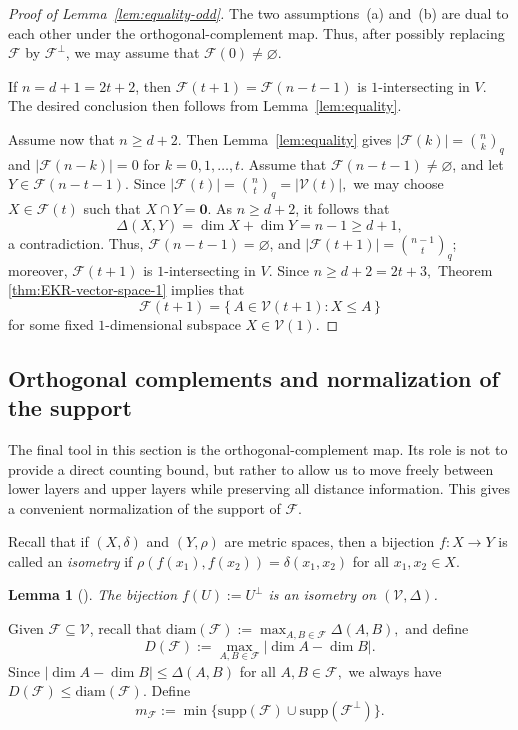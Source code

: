 \documentclass[11pt]{article}
\newtheorem{lemma}[theorem]{Lemma}
\theoremstyle{definition}
\newcommand{\qbinom}[2]{\genfrac{(}{)}{0pt}{}{#1}{#2}_q}
\newcommand{\diam}{\mathrm{diam}}
\newcommand{\supp}{\mathrm{supp}}
\begin{document}
\begin{proof}[Proof of Lemma~\ref{lem:equality-odd}]
The two assumptions~(a) and~(b) are dual to each other under the orthogonal-complement map. 
Thus, after possibly replacing $\mathcal{F}$ by $\mathcal{F}^\perp$, we may assume that $\mathcal{F}(0)\neq \varnothing$. 

If $n=d+1=2t+2$, then $\mathcal{F}(t+1)=\mathcal{F}(n-t-1)$ is $1$-intersecting in $V$. 
The desired conclusion then follows from Lemma~\ref{lem:equality}.

Assume now that $n\ge d+2$. Then Lemma~\ref{lem:equality} gives
\(
|\mathcal{F}(k)|=\qbinom{n}{k}\)
and
\(
|\mathcal{F}(n-k)|=0
\)
for \(k=0,1,\ldots,t.\)
Assume that $\mathcal{F}(n-t-1) \neq \varnothing$, and let $Y \in \mathcal{F}(n-t-1)$. Since
\(
|\mathcal{F}(t)| = \qbinom{n}{t} = |\mathcal V(t)|,
\)
we may choose $X \in \mathcal{F}(t)$ such that $X \cap Y = \boldsymbol{0}$. As $n \ge d+2$, it follows that
\[
\Delta(X,Y) = \dim X + \dim Y = n-1 \ge d+1,
\]
a contradiction. Thus, $\mathcal{F}(n-t-1) = \varnothing$, and $|\mathcal{F}(t+1)| = \qbinom{n-1}{t}$; moreover, $\mathcal{F}(t+1)$ is $1$-intersecting in $V$.
Since
\(
n\ge d+2=2t+3,
\) 
Theorem \ref{thm:EKR-vector-space-1} implies that
\[
\mathcal{F}(t+1)=\{\,A\in \mathcal{V}(t+1): X \le A\,\}
\]
for some fixed $1$-dimensional subspace $X \in \mathcal{V}(1)$.
\qedhere
\end{proof}

\subsection{Orthogonal complements and normalization of the support}

The final tool in this section is the orthogonal-complement map. 
Its role is not to provide a direct counting bound, but rather to allow us to move freely between lower layers and upper layers while preserving all distance information. 
This gives a convenient normalization of the support of $\mathcal{F}$.

Recall that if $(X,\delta)$ and $(Y,\rho)$ are metric spaces, then a bijection $f:X\to Y$ is called an \emph{isometry} if
\(
\rho(f(x_1),f(x_2))=\delta(x_1,x_2)\)
for all \(x_1,x_2\in X.\)


\begin{lemma}[\cite{LLY2026}]\label{lem:orthogonal}
The bijection $f(U):=U^\perp$ is an isometry on $(\mathcal{V},\Delta)$.
\end{lemma}

Given $\mathcal{F}\subseteq \mathcal{V}$, recall that
\(
\diam(\mathcal{F})
:=
\max_{A,B\in \mathcal{F}}\Delta(A,B),
\)
and define
\[
D(\mathcal{F})
:=
\max_{A,B\in \mathcal{F}} |\dim A-\dim B|.
\]
Since
\(
|\dim A-\dim B|\le \Delta(A,B)
\)
for all \(A,B\in \mathcal{F},\)
we always have
\(
D(\mathcal{F})\le \diam(\mathcal{F}).
\)
Define
\[
m_{\mathcal{F}}
:=
\min\{
\supp(\mathcal{F})
\cup 
\supp(\mathcal{F}^\perp)\}.
\]
\end{document}
